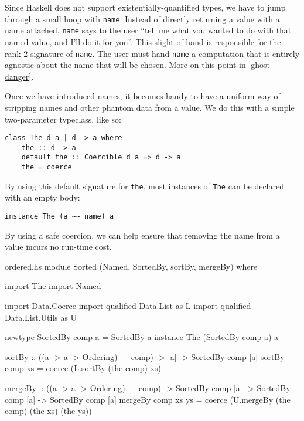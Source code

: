 \documentclass[format=sigplan, review=false, screen=true]{acmart}
\begin{document}
Since Haskell does not support existentially-quantified types, we have to jump through
a small hoop with \texttt{name}. Instead of directly returning a value with a name attached,
\texttt{name} says to the user ``tell me what you wanted to do with that named value,
and I'll do it for you''. This slight-of-hand is responsible for the rank-2
signature of \texttt{name}. The user must hand \texttt{name} a computation that is
entirely agnostic about the name that will be chosen. More on this point in \cref{ghost-danger}.

Once we have introduced names, it becomes handy to have a uniform way of stripping names
and other phantom data from a value. We do this with a simple two-parameter typeclass,
like so:
\begin{verbatim}
class The d a | d -> a where
    the :: d -> a
    default the :: Coercible d a => d -> a
    the = coerce
\end{verbatim}
By using this default signature for \texttt{the}, most instances of \texttt{The}
can be declared with an empty body:
\begin{verbatim}
instance The (a ~~ name) a
\end{verbatim}
By using a safe coercion, we can help ensure that removing the name from a value
incurs no run-time cost.

\begin{filecontents*}{ordered.hs}
module Sorted (Named, SortedBy, sortBy, mergeBy) where   

import The
import Named

import           Data.Coerce
import qualified Data.List       as L
import qualified Data.List.Utils as U

newtype SortedBy comp a = SortedBy a
instance The (SortedBy comp a) a
  
sortBy :: ((a -> a -> Ordering) ~~ comp)
       -> [a]
       -> SortedBy comp [a]
sortBy comp xs = coerce (L.sortBy (the comp) xs)

mergeBy :: ((a -> a -> Ordering) ~~ comp)
        -> SortedBy comp [a]
        -> SortedBy comp [a]
        -> SortedBy comp [a]
mergeBy comp xs ys =
  coerce (U.mergeBy (the comp) (the xs) (the ys))        
\end{filecontents*}

\end{document}
